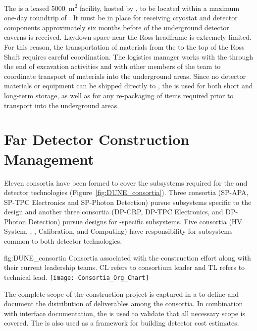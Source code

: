 The  is a leased \SI{5000}{\square\meter} facility, hosted by 
, to be located within a maximum one-day roundtrip of .  
It must be in place for receiving cryostat and detector 
components approximately six months before 
of the underground detector caverns is received. 
 Laydown space near the Ross headframe is extremely 
limited.  For this reason, the transportation of materials from 
the  to the top of the Ross Shaft requires careful 
coordination. The  logistics manager works 
with the  through the end of excavation activities  
and with other members of the  team to coordinate transport 
of materials into the underground areas.  Since no detector materials or 
equipment can be shipped directly to , %
the  is used for both short and long-term storage, as 
well as for any re-packaging of items required prior to transport 
into the underground areas. 


\section{Far Detector Construction Management}
\label{sec:es-tc-det-mgmt}


Eleven  consortia have been formed to cover 
the subsystems required for the  and  detector technologies  (Figure~\ref{fig:DUNE_consortia}). %
Three consortia (SP-APA, SP-TPC
Electronics and SP-Photon Detection) pursue subsystems specific to
the  design and another three consortia (DP-CRP, DP-TPC
Electronics, and DP-Photon Detection) pursue designs for -specific 
subsystems.  %
Five consortia (HV System, ,
, Calibration, and Computing)
have responsibility for subsystems common to both detector
technologies.    

\begin{dunefigure}{fig:DUNE_consortia}
  {Consortia associated with the  construction effort along with their 
current leadership teams. CL refers to consortium leader
    and TL refers to technical lead.}
  \texttt{[image: Consortia\_Org\_Chart]}
\end{dunefigure}

The complete scope of the  construction project is captured in a 
 to define and document the distribution of deliverables among 
the consortia.  In combination with interface documentation, the 
 is used to validate that all necessary scope is covered.  The 
 is also used as a framework for building  
detector cost estimates.


